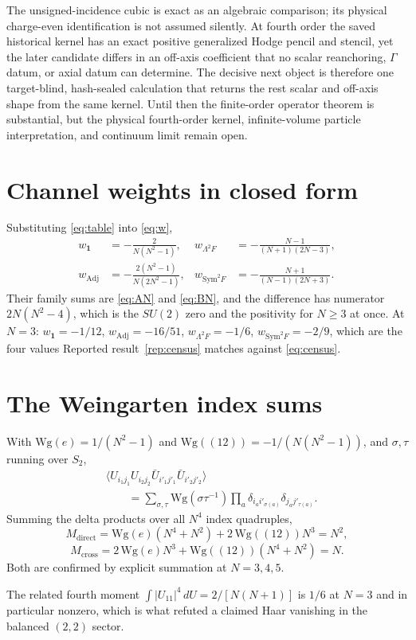 \documentclass[11pt]{article}
\theoremstyle{plain}
\theoremstyle{definition}
\theoremstyle{remark}
\newcommand{\chk}[1]{}
\begin{document}
The unsigned-incidence cubic is exact as an algebraic comparison; its physical
charge-even identification is not assumed silently. At fourth order the saved
historical kernel has an exact positive generalized Hodge pencil and stencil,
yet the later candidate differs in an off-axis coefficient that no scalar
reanchoring, $\Gamma$ datum, or axial datum can determine. The decisive next
object is therefore one target-blind, hash-sealed calculation that returns the
rest scalar and off-axis shape from the same kernel. Until then the finite-order
operator theorem is substantial, but the physical fourth-order kernel,
infinite-volume particle interpretation, and continuum limit remain open.

\appendix

\section{Channel weights in closed form}\label{app:closed}

Substituting \eqref{eq:table} into \eqref{eq:w},
\begingroup\small
\begin{align*}
  w_{\mathbf 1}&=-\frac{2}{N(N^2-1)}, &
  w_{\Lambda^2F}&=-\frac{N-1}{(N+1)(2N-3)},\\
  w_{\mathrm{Adj}}&=-\frac{2(N^2-1)}{N(2N^2-1)}, &
  w_{\mathrm{Sym}^2F}&=-\frac{N+1}{(N-1)(2N+3)} .
\end{align*}
\endgroup
Their family sums are \eqref{eq:AN} and \eqref{eq:BN}, and the difference has
numerator $2N(N^2-4)$, which is the $SU(2)$ zero and the positivity for
$N\ge3$ at once.
\chk{the four channel weights follow from dimension and Casimir} At $N=3$:
$w_{\mathbf 1}=-1/12$, $w_{\mathrm{Adj}}=-16/51$, $w_{\Lambda^2F}=-1/6$,
$w_{\mathrm{Sym}^2F}=-2/9$, which are the four values
Reported result~\ref{rep:census} matches against \eqref{eq:census}.

\section{The Weingarten index sums}\label{app:wg}

With $\mathrm{Wg}(e)=1/(N^2-1)$ and $\mathrm{Wg}((12))=-1/(N(N^2-1))$, and
$\sigma,\tau$ running over $S_2$,
\[
  \begin{aligned}
    &\bigl\langle U_{i_1j_1}U_{i_2j_2}
       \bar U_{i'_1j'_1}\bar U_{i'_2j'_2}\bigr\rangle\\
    &\qquad=\sum_{\sigma,\tau}\mathrm{Wg}(\sigma\tau^{-1})
      \prod_a \delta_{i_ai'_{\sigma(a)}}\delta_{j_aj'_{\tau(a)}} .
  \end{aligned}
\]
Summing the delta products over all $N^4$ index quadruples,
\[
  M_{\mathrm{direct}}=\mathrm{Wg}(e)(N^4+N^2)+2\,\mathrm{Wg}((12))N^3=N^2,
\]
\[
  M_{\mathrm{cross}}=2\,\mathrm{Wg}(e)N^3+\mathrm{Wg}((12))(N^4+N^2)=N .
\]
Both are confirmed by explicit summation at $N=3,4,5$.
\chk{the shared-link weights are Weingarten, not an isotropy assumption}
The related fourth moment $\int|U_{11}|^4\,dU=2/[N(N+1)]$ is $1/6$ at $N=3$ and in particular
nonzero, which is what refuted a claimed Haar vanishing in the balanced
$(2,2)$ sector.
\chk{SU(3) Weingarten values follow from the general formula}
\chk{the fourth moment integral |U\_11|\^{}4 = 1/6 at N = 3}
\end{document}
